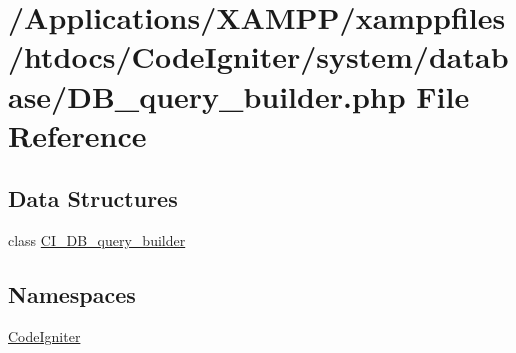 \hypertarget{_d_b__query__builder_8php}{}\section{/\+Applications/\+X\+A\+M\+P\+P/xamppfiles/htdocs/\+Code\+Igniter/system/database/\+D\+B\+\_\+query\+\_\+builder.php File Reference}
\label{_d_b__query__builder_8php}
\subsection*{Data Structures}
\begin{DoxyCompactItemize}
\item 
class \mbox{\hyperlink{class_c_i___d_b__query__builder}{C\+I\+\_\+\+D\+B\+\_\+query\+\_\+builder}}
\end{DoxyCompactItemize}
\subsection*{Namespaces}
\begin{DoxyCompactItemize}
\item 
 \mbox{\hyperlink{namespace_code_igniter}{Code\+Igniter}}
\end{DoxyCompactItemize}
